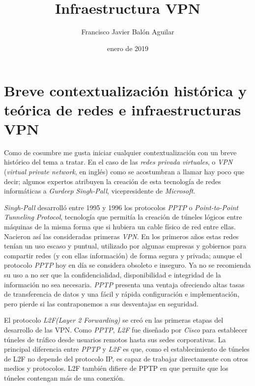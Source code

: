 \documentclass[a4paper, 11pt, titlepage]{article}
\title{\textbf{\nombre} \\ Infraestructura VPN}
\author{Francisco Javier Balón Aguilar}
\date{enero de 2019}
\begin{document}
\maketitle
\renewcommand{\contentsname}{Índice}
\tableofcontents
\newpage

\section{Breve contextualización histórica y teórica de redes e infraestructuras VPN}

    Como de cosumbre me gusta iniciar cualquier contextualización con un breve histórico del
    tema a tratar. En el caso de las \textit{redes privada virtuales}, o \textit{VPN} 
    (\textit{virtual private network}, en inglés) como se acostumbran a llamar hay poco que
    decir; algunos expertos atribuyen la creación de esta tecnología de redes informáticas a
    \textit{Gurdeep Singh-Pall}, vicepresidente de \textit{Microsoft}. 

    \textit{Singh-Pall} desarrolló entre 1995 y 1996 los protocolos \textit{PPTP} o \textit{
    Point-to-Point Tunneling Protocol}, tecnología que permitía la creación de túneles lógicos
    entre máquinas de la misma forma que si hubiera un cable físico de red entre ellas. Nacieron
    así las consideradas primeras \textit{VPN}. En los primeros años estas redes tenían un uso escaso 
    y puntual, utilizado por algunas empresas y gobiernos para compartir redes (y con ellas información) 
    de forma segura y privada; aunque el protocolo \textit{PPTP} hoy en día se considera obsoleto e 
    inseguro. Ya no se recomienda su uso a no ser que la confidencialidad, disponibilidad e integridad de
    la información no sea necesaria. \textit{PPTP} presenta una ventaja ofreciendo altas tasas de 
    transferencia de datos y una fácil y rápida configuración e implementación, pero pierde si las 
    contraponemos a sus desventajas en seguridad.
    
    El protocolo \textit{L2F(Layer 2 Forwarding)} se creó en las primeras etapas del desarrollo de las VPN.
    Como \textit{PPTP}, \textit{L2F} fue diseñado por \textit{Cisco} para establecer túneles de tráfico desde 
    usuarios remotos hasta sus sedes corporativas. La principal diferencia entre \textit{PPTP} y \textit{L2F} 
    es que, como el establecimiento de túneles de L2F no depende del protocolo IP, es capaz de trabajar directamente
    con otros medios y protocolos. L2F también difiere de PPTP en que permite que los túneles contengan más 
    de una conexión. 
\end{document}
